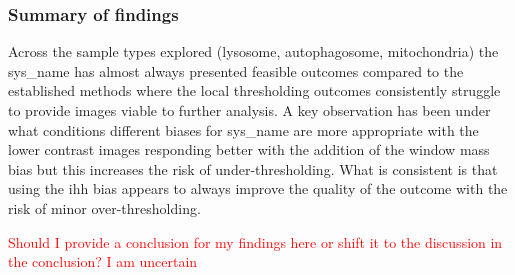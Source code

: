 \subsubsection{Summary of findings}
Across the sample types explored (lysosome, autophagosome, mitochondria) the \gls{sys_name} has almost always presented feasible outcomes compared to the established methods where the local thresholding outcomes consistently struggle to provide images viable to further analysis. A key observation has been under what conditions different biases for \gls{sys_name} are more appropriate with the lower contrast images responding better with the addition of the window mass bias but this increases the risk of under-thresholding. What is consistent is that using the \gls{ihh} bias appears to always improve the quality of the outcome with the risk of minor over-thresholding.

\textcolor{red}{Should I provide a conclusion for my findings here or shift it to the discussion in the conclusion? I am uncertain}